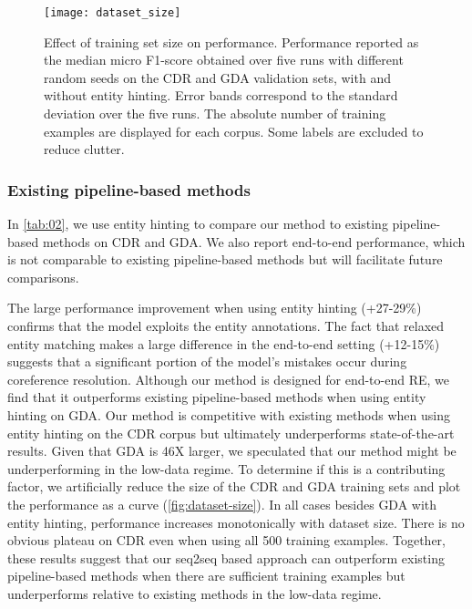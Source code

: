 \documentclass[11pt]{article}
\begin{document}
\begin{figure}[t]
\centering
\texttt{[image: dataset\_size]}
\caption{Effect of training set size on performance. Performance reported as the median micro F1-score obtained over five runs with different random seeds on the CDR and GDA validation sets, with and without entity hinting. Error bands correspond to the standard deviation over the five runs. The absolute number of training examples are displayed for each corpus. Some labels are excluded to reduce clutter.}
\label{fig:dataset-size}
\end{figure}


\subsubsection{Existing pipeline-based methods}
\label{existing-pipeline-based-methods}

In \autoref{tab:02}, we use entity hinting to compare our method to existing pipeline-based methods on CDR and GDA. We also report end-to-end performance, which is not comparable to existing pipeline-based methods but will facilitate future comparisons.

The large performance improvement when using entity hinting (+27-29\%) confirms that the model exploits the entity annotations. The fact that relaxed entity matching makes a large difference in the end-to-end setting (+12-15\%) suggests that a significant portion of the model's mistakes occur during coreference resolution. Although our method is designed for end-to-end RE, we find that it outperforms existing pipeline-based methods when using entity hinting on GDA. Our method is competitive with existing methods when using entity hinting on the CDR corpus but ultimately underperforms state-of-the-art results. Given that GDA is 46X larger, we speculated that our method might be underperforming in the low-data regime. To determine if this is a contributing factor, we artificially reduce the size of the CDR and GDA training sets and plot the performance as a curve (\autoref{fig:dataset-size}). In all cases besides GDA with entity hinting, performance increases monotonically with dataset size. There is no obvious plateau on CDR even when using all 500 training examples. Together, these results suggest that our seq2seq based approach can outperform existing pipeline-based methods when there are sufficient training examples but underperforms relative to existing methods in the low-data regime.
\end{document}

